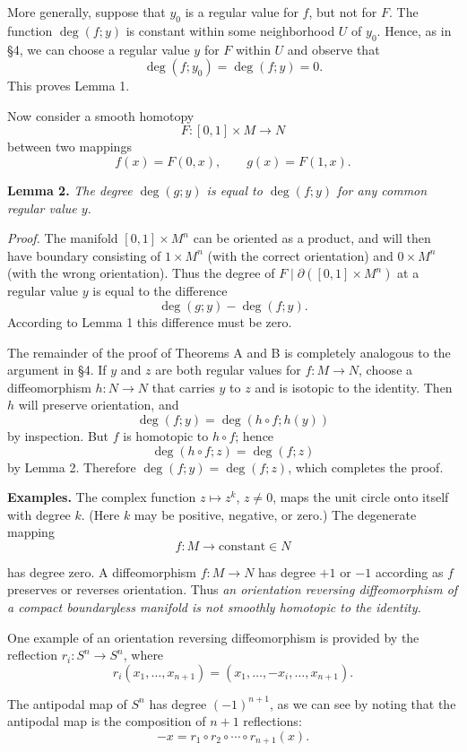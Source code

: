 More generally, suppose that $y_0$ is a regular value for $f$, but not for $F$. The function $\deg(f; y)$ is constant within some neighborhood $U$ of $y_0$. Hence, as in §4, we can choose a regular value $y$ for $F$ within $U$ and observe that
\[
\deg(f; y_0) = \deg(f; y) = 0.
\]
This proves Lemma 1.

Now consider a smooth homotopy
\[
F : [0, 1] \times M \to N
\]
between two mappings
\[
f(x) = F(0, x), \qquad g(x) = F(1, x).
\]

\noindent\textbf{Lemma 2.} \textit{The degree $\deg(g; y)$ is equal to $\deg(f; y)$ for any common regular value $y$.}

\noindent\textit{Proof.}
The manifold $[0, 1] \times M^n$ can be oriented as a product, and will then have boundary consisting of $1 \times M^n$ (with the correct orientation) and $0 \times M^n$ (with the wrong orientation). Thus the degree of $F \mid \partial([0, 1] \times M^n)$ at a regular value $y$ is equal to the difference
\[
\deg(g; y) - \deg(f; y).
\]
According to Lemma 1 this difference must be zero.

The remainder of the proof of Theorems A and B is completely analogous to the argument in §4. If $y$ and $z$ are both regular values for $f : M \to N$, choose a diffeomorphism $h : N \to N$ that carries $y$ to $z$ and is isotopic to the identity. Then $h$ will preserve orientation, and
\[
\deg(f; y) = \deg(h \circ f; h(y))
\]
by inspection. But $f$ is homotopic to $h \circ f$; hence
\[
\deg(h \circ f; z) = \deg(f; z)
\]
by Lemma 2. Therefore $\deg(f; y) = \deg(f; z)$, which completes the proof.

\noindent\textbf{Examples.} The complex function $z \mapsto z^k$, $z \neq 0$, maps the unit circle onto itself with degree $k$. (Here $k$ may be positive, negative, or zero.) The degenerate mapping
\[
f : M \longrightarrow \text{constant} \in N
\]



has degree zero. A diffeomorphism $f : M \to N$ has degree $+1$ or $-1$ according as $f$ preserves or reverses orientation. Thus \emph{an orientation reversing diffeomorphism of a compact boundaryless manifold is not smoothly homotopic to the identity.}

One example of an orientation reversing diffeomorphism is provided by the reflection $r_i : S^n \to S^n$, where
\[
r_i(x_1, \ldots, x_{n+1}) = (x_1, \ldots, -x_i, \ldots, x_{n+1}).
\]

The antipodal map of $S^n$ has degree $(-1)^{n+1}$, as we can see by noting that the antipodal map is the composition of $n+1$ reflections:
\[
-x = r_1 \circ r_2 \circ \cdots \circ r_{n+1}(x).
\]

